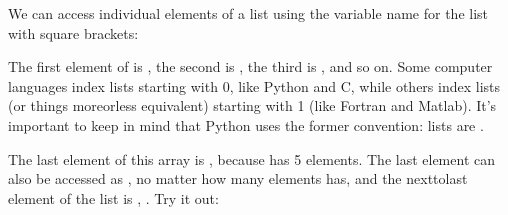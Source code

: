 \documentclass[letterpaper,10pt,english]{sphinxmanual}
\begin{document}
\sphinxAtStartPar
We can access individual elements of a list using the variable name for the list with square brackets:

\begin{sphinxVerbatim}[commandchars=\\\{\},numbers=left,firstnumber=1,stepnumber=1]
\PYG{p}{[}\PYG{p}{]}

\PYG{p}{[}\PYG{p}{]}

\PYG{p}{[}\PYG{p}{]}
\end{sphinxVerbatim}

\sphinxAtStartPar
The first element of  is , the second is , the third is , and so on.  Some computer languages index lists starting with 0, like Python and C, while others index lists (or things more\sphinxhyphen{}or\sphinxhyphen{}less equivalent) starting with 1 (like Fortran and Matlab).  It’s important to keep in mind that Python uses the former convention: lists are .

\sphinxAtStartPar
The last element of this array is , because  has 5 elements.  The last element can also be accessed as , no matter how many elements  has, and the next\sphinxhyphen{}to\sphinxhyphen{}last element of the list is , . Try it out:

\begin{sphinxVerbatim}[commandchars=\\\{\},numbers=left,firstnumber=1,stepnumber=1]
\PYG{p}{[}\PYG{p}{]}

\PYG{p}{[}\PYG{p}{]}

\PYG{p}{[}\PYG{p}{]}
\end{sphinxVerbatim}
\end{document}
